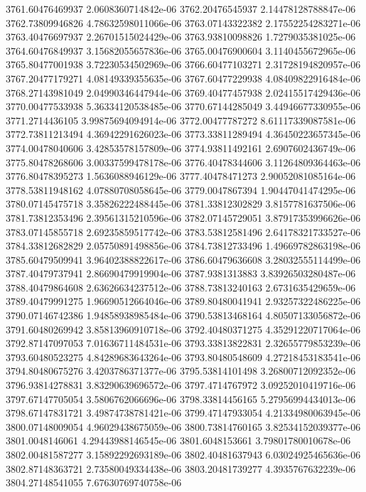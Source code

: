 {3761.60476469937 2.0608360714842e-06
3762.20476545937 2.14478128788847e-06
3762.73809946826 4.78632598011066e-06
3763.07143322382 2.17552254283271e-06
3763.40476697937 2.26701515024429e-06
3763.93810098826 1.7279035381025e-06
3764.60476849937 3.15682055657836e-06
3765.00476900604 3.1140455672965e-06
3765.80477001938 3.72230534502969e-06
3766.60477103271 2.31728194820957e-06
3767.20477179271 4.08149339355635e-06
3767.60477229938 4.08409822916484e-06
3768.27143981049 2.04990346447944e-06
3769.40477457938 2.02415517429436e-06
3770.00477533938 5.36334120538485e-06
3770.67144285049 3.44946677330955e-06
3771.2714436105 3.99875694094914e-06
3772.00477787272 8.61117339087581e-06
3772.73811213494 4.36942291626023e-06
3773.33811289494 4.36450223657345e-06
3774.00478040606 3.42853578157809e-06
3774.93811492161 2.6907602436749e-06
3775.80478268606 3.00337599478178e-06
3776.40478344606 3.11264809364463e-06
3776.80478395273 1.5636088946129e-06
3777.40478471273 2.90052081085164e-06
3778.53811948162 4.07880708058645e-06
3779.0047867394 1.90447041474295e-06
3780.07145475718 3.35826222488445e-06
3781.33812302829 3.8157781637506e-06
3781.73812353496 2.39561315210596e-06
3782.07145729051 3.87917353996626e-06
3783.07145855718 2.69235859517742e-06
3783.53812581496 2.64178321733527e-06
3784.33812682829 2.05750891498856e-06
3784.73812733496 1.49669782863198e-06
3785.60479509941 3.96402388822617e-06
3786.60479636608 3.28032555114499e-06
3787.40479737941 2.86690479919904e-06
3787.9381313883 3.83926503280487e-06
3788.40479864608 2.63626634237512e-06
3788.73813240163 2.6731635429659e-06
3789.40479991275 1.96690512664046e-06
3789.80480041941 2.93257322486225e-06
3790.07146742386 1.94858938985484e-06
3790.53813468164 4.80507133056872e-06
3791.60480269942 3.85813960910718e-06
3792.40480371275 4.35291220717064e-06
3792.87147097053 7.01636711484531e-06
3793.33813822831 2.32655779853239e-06
3793.60480523275 4.84289683643264e-06
3793.80480548609 4.27218453183541e-06
3794.80480675276 3.4203786371377e-06
3795.53814101498 3.26800712092352e-06
3796.93814278831 3.83290639696572e-06
3797.4714767972 3.09252010419716e-06
3797.67147705054 3.5806762066696e-06
3798.33814456165 5.27956994434013e-06
3798.67147831721 3.49874738781421e-06
3799.47147933054 4.21334980063945e-06
3800.07148009054 4.96029438675059e-06
3800.73814760165 3.82534152039377e-06
3801.0048146061 4.29443988146545e-06
3801.6048153661 3.79801780010678e-06
3802.00481587277 3.15892292693189e-06
3802.40481637943 6.03024925465636e-06
3802.87148363721 2.73580049334438e-06
3803.20481739277 4.3935767632239e-06
3804.27148541055 7.67630769740758e-06
}
